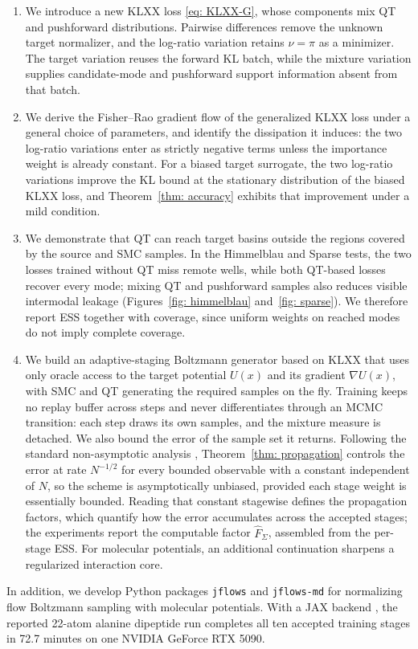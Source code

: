\documentclass{article}
\begin{document}
\begin{enumerate}
	\setlength{\itemsep}{0pt}
	\item We introduce a new KLXX loss \eqref{eq: KLXX-G}, whose components mix QT and pushforward distributions. Pairwise differences remove the unknown target normalizer, and the log-ratio variation retains $\nu=\pi$ as a minimizer. The target variation reuses the forward KL batch, while the mixture variation supplies candidate-mode and pushforward support information absent from that batch.

	\item We derive the Fisher--Rao gradient flow of the generalized KLXX loss under a general choice of parameters, {\color{blue}and identify the dissipation it induces: the two log-ratio variations enter as strictly negative terms unless the importance weight is already constant.} For a biased target surrogate, the two log-ratio variations improve the KL bound at the stationary distribution of the biased KLXX loss, and Theorem~\ref{thm: accuracy} exhibits that improvement under a mild condition.

	\item We demonstrate that QT can reach target basins outside the regions covered by the source and SMC samples. In the Himmelblau and Sparse tests, the two losses trained without QT miss remote wells, while both QT-based losses recover every mode; mixing QT and pushforward samples also reduces visible intermodal leakage (Figures~\ref{fig: himmelblau} and~\ref{fig: sparse}). We therefore report ESS together with coverage, since uniform weights on reached modes do not imply complete coverage.

	\item We build an adaptive-staging Boltzmann generator based on KLXX that uses only oracle access to the target potential $U(x)$ and its gradient $\nabla U(x)$, with SMC and QT generating the required samples on the fly. {\color{blue}Training keeps no replay buffer across steps and never differentiates through an MCMC transition: each step draws its own samples, and the mixture measure is detached.} We also bound the error of the sample set it returns. {\color{blue}Following the standard non-asymptotic analysis \citep{delmoral2004feynman,chopin2020introduction}, Theorem~\ref{thm: propagation} controls the error} at rate $N^{-1/2}$ for every bounded observable with a constant independent of $N$, so the scheme is asymptotically unbiased{\color{purple}, provided each stage weight is essentially bounded}. Reading that constant stagewise defines the propagation factors, which quantify how the error accumulates across the accepted stages; the experiments report the computable factor $\hat F_\Sigma$, assembled from the per-stage ESS. For molecular potentials, an additional continuation sharpens a regularized interaction core.
\end{enumerate}
In addition, we develop Python packages \texttt{jflows} and \texttt{jflows-md} for normalizing flow Boltzmann sampling with molecular potentials. With a JAX backend \citep{jax2018github}, the reported 22-atom alanine dipeptide run completes all ten accepted training stages in 72.7 minutes on one NVIDIA GeForce RTX 5090.
\end{document}
